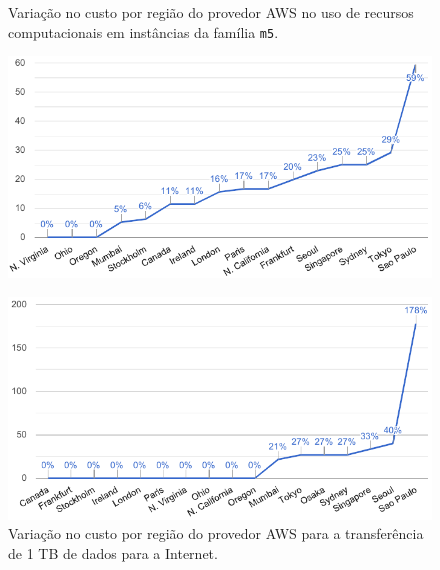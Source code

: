 \documentclass[english,brazilian]{UNISINOSmonografia} %
\begin{document}
\begin{figure}
	\centering%
	\begin{minipage}{.49\textwidth}
		\caption{Variação no custo por região do provedor AWS no uso de recursos computacionais em instâncias da família \texttt{m5}.}
		\label{fig:metodologia-infra-cost-compute}
		\includegraphics[width=\textwidth]{aws-compute-costperregion}
	\end{minipage}
	\hfill
	\begin{minipage}{.49\textwidth}
		\caption{Variação no custo por região do provedor AWS para a transferência de 1 TB de dados para a Internet.}
		\label{fig:metodologia-infra-cost-network}
		\includegraphics[width=\textwidth]{aws-network-costperregion}
	\end{minipage}
\end{figure}
\end{document}
